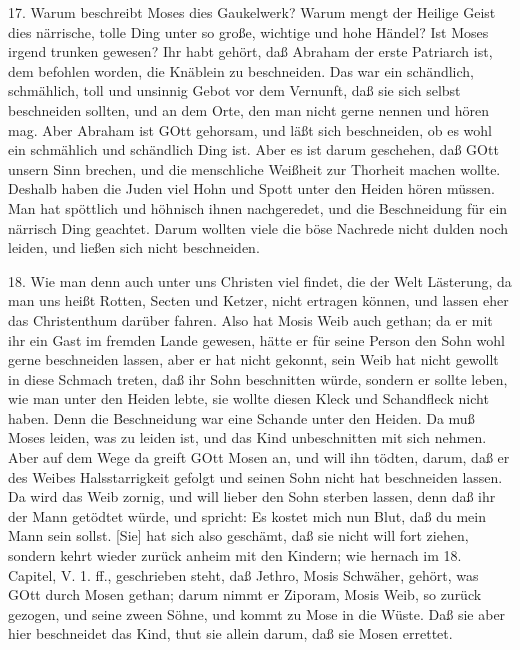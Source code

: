 17. Warum beschreibt Moses dies Gaukelwerk? Warum mengt der Heilige Geist dies närrische, tolle Ding unter so große, wichtige und hohe Händel? Ist Moses irgend trunken gewesen? Ihr habt gehört, daß Abraham der erste Patriarch ist, dem befohlen worden, die Knäblein zu beschneiden. Das war ein schändlich, schmählich, toll und unsinnig Gebot vor dem Vernunft, daß sie sich selbst beschneiden sollten, und an dem Orte, den man nicht gerne nennen und hören mag. Aber Abraham ist GOtt gehorsam, und läßt sich beschneiden, ob es wohl ein schmählich und schändlich Ding ist. Aber es ist darum geschehen, daß GOtt unsern Sinn brechen, und die menschliche Weißheit zur Thorheit machen wollte. Deshalb haben die Juden viel Hohn und Spott unter den Heiden hören müssen. Man hat spöttlich und höhnisch ihnen nachgeredet, und die Beschneidung für ein närrisch Ding geachtet. Darum wollten viele die böse Nachrede nicht dulden noch leiden, und ließen sich nicht beschneiden.

18. Wie man denn auch unter uns Christen viel findet, die der Welt Lästerung, da man uns heißt Rotten, Secten und Ketzer, nicht ertragen können, und lassen eher das Christenthum darüber fahren. Also hat Mosis Weib auch gethan; da er mit ihr ein Gast im fremden Lande gewesen, hätte er für seine Person den Sohn wohl gerne beschneiden lassen, aber er hat nicht gekonnt, sein Weib hat nicht gewollt in diese Schmach treten, daß ihr Sohn beschnitten würde, sondern er sollte leben, wie man unter den Heiden lebte, sie wollte diesen Kleck und Schandfleck nicht haben. Denn die Beschneidung war eine Schande unter den Heiden. Da muß Moses leiden, was zu leiden ist, und das Kind unbeschnitten mit sich nehmen. Aber auf dem Wege da greift GOtt Mosen an, und will ihn tödten, darum, daß er des Weibes Halsstarrigkeit gefolgt und seinen Sohn nicht hat beschneiden lassen. Da wird das Weib zornig, und will lieber den Sohn sterben lassen, denn daß ihr der Mann getödtet würde, und spricht: Es kostet mich nun Blut, daß du mein Mann sein sollst. [Sie] hat sich also geschämt, daß sie nicht will fort ziehen, sondern kehrt wieder zurück anheim mit den Kindern; wie hernach im 18. Capitel, V. 1. ff., geschrieben steht, daß Jethro, Mosis Schwäher, gehört, was GOtt durch Mosen gethan; darum nimmt er Ziporam, Mosis Weib, so zurück gezogen, und seine zween Söhne, und kommt zu Mose in die Wüste. Daß sie aber hier beschneidet das Kind, thut sie allein darum, daß sie Mosen errettet.

